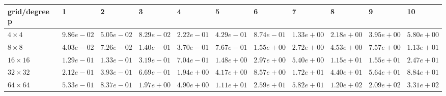 \begin{tabular}{lllllllllll}
\hline
 grid/degree p   & 1          & 2          & 3          & 4          & 5          & 6          & 7          & 8          & 9          & 10         \\
\hline
 $4 \times 4$    & $9.86e-02$ & $5.05e-02$ & $8.29e-02$ & $2.22e-01$ & $4.29e-01$ & $8.74e-01$ & $1.33e+00$ & $2.18e+00$ & $3.95e+00$ & $5.80e+00$ \\
 $8 \times 8$    & $4.03e-02$ & $7.26e-02$ & $1.40e-01$ & $3.70e-01$ & $7.67e-01$ & $1.55e+00$ & $2.72e+00$ & $4.53e+00$ & $7.57e+00$ & $1.13e+01$ \\
 $16 \times 16$  & $1.29e-01$ & $1.33e-01$ & $3.19e-01$ & $7.04e-01$ & $1.48e+00$ & $2.97e+00$ & $5.40e+00$ & $1.15e+01$ & $1.55e+01$ & $2.47e+01$ \\
 $32 \times 32$  & $2.12e-01$ & $3.93e-01$ & $6.69e-01$ & $1.94e+00$ & $4.17e+00$ & $8.57e+00$ & $1.72e+01$ & $4.40e+01$ & $5.64e+01$ & $8.84e+01$ \\
 $64 \times 64$  & $5.33e-01$ & $8.37e-01$ & $1.97e+00$ & $4.90e+00$ & $1.11e+01$ & $2.59e+01$ & $5.82e+01$ & $1.20e+02$ & $2.09e+02$ & $3.31e+02$ \\
\hline
\end{tabular}